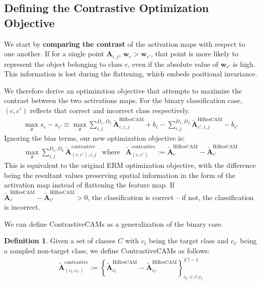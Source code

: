 \documentclass{article}
\theoremstyle{plain}
\theoremstyle{definition}
\newtheorem{definition}[theorem]{Definition}
\theoremstyle{remark}
\begin{document}
\subsection{Defining the Contrastive Optimization Objective}

We start by \textbf{comparing the contrast} of the activation maps with respect to one another. If for a single point $\bm{A}_{i,j}$, $\bm{w}_c > \bm{w}_{c'}$, that point is more likely to represent the object belonging to class $c$, even if the absolute value of $\bm{w}_{c'}$ is high. This information is lost during the flattening, which embeds positional invariance.

We therefore derive an optimization objective that attempts to maximize the contrast between the two activations maps. For the binary classification case, $(c, c')$ reflects that correct and incorrect class respectively.
\begin{gather}
	\max_{\theta} s_c - s_{c'} \equiv \max_{\theta} \sum^{D_1,D_2}_{i,j} \tilde{\mathcal{\bm{A}}}_{c,i,j}^{\text{HiResCAM}} + b_c - \sum^{D_1,D_2}_{i,j} \tilde{\mathcal{\bm{A}}}_{c',i,j}^{\text{HiResCAM}} - b_{c'}
\end{gather}
Ignoring the bias terms, our new optimization objective is:
\begin{gather}
	\max_{\theta} \sum^{D_1,D_2}_{i,j} \tilde{\mathcal{\bm{A}}}^{\text{contrastive}}_{(c, c'), i, j} ~~\text{ where }~~ \tilde{\mathcal{\bm{A}}}^{\text{contrastive}}_{(c, c')} := \tilde{\mathcal{\bm{A}}}_{c}^{\text{HiResCAM}} - \tilde{\mathcal{\bm{A}}}_{c'}^{\text{HiResCAM}}
\end{gather}
This is equivalent to the original ERM optimization objective, with the difference being the resultant values preserving spatial information in the form of the activation map instead of flattening the feature map. If $\tilde{\mathcal{\bm{A}}}_{c}^{\text{HiResCAM}} - \tilde{\mathcal{\bm{A}}}_{c'}^{\text{HiResCAM}} > 0$, the classification is correct -- if not, the classification is incorrect. 

We can define ContrastiveCAMs as a generalization of the binary case.

\begin{definition}
	Given a set of classes $C$ with $c_t$ being the target class and $c_{t'}$ being a sampled non-target class, we define ContrastiveCAMs as follows:
	\begin{gather}
		\tilde{\mathcal{\bm{A}}}^{\text{contrastive}}_{(c_t, c_{t'})} := \left\{\tilde{\mathcal{\bm{A}}}_{c_t}^{\text{HiResCAM}} - \tilde{\mathcal{\bm{A}}}_{c_{t'}}^{\text{HiResCAM}}\right\}^{|C|-1}_{c_{t'} \in c \setminus c_t}
	\end{gather}
\end{definition}
\end{document}
